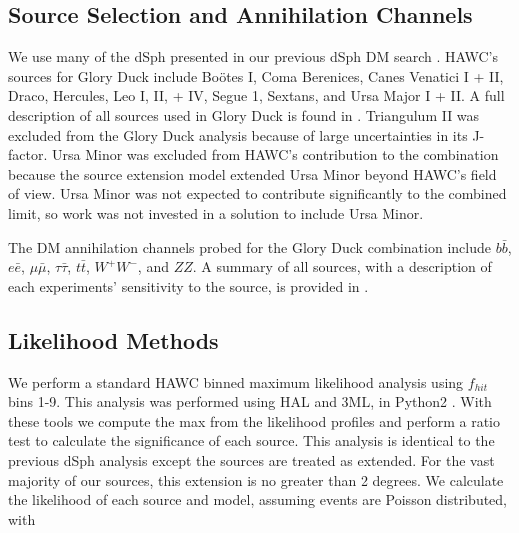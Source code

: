 \subsection{Source Selection and Annihilation Channels}\label{sec:gd_srcs_y_chan}

We use many of the dSph presented in our previous dSph DM search \cite{Albert_2018}.
HAWC's sources for Glory Duck include Boötes I, Coma Berenices, Canes Venatici I + II, Draco, Hercules, Leo I, II, + IV, Segue 1, Sextans, and Ursa Major I + II.
A full description of all sources used in Glory Duck is found in .
Triangulum II was excluded from the Glory Duck analysis because of large uncertainties in its J-factor.
Ursa Minor was excluded from HAWC's contribution to the combination because the source extension model extended Ursa Minor beyond HAWC's field of view.
Ursa Minor was not expected to contribute significantly to the combined limit, so work was not invested in a solution to include Ursa Minor.

The DM annihilation channels probed for the Glory Duck combination include $b\bar{b}$, $e\bar{e}$, $\mu\bar{\mu}$, $\tau\bar{\tau}$, $t\bar{t}$, $W^+W^-$, and $ZZ$.
A summary of all sources, with a description of each experiments' sensitivity to the source, is provided in .




\subsection{Likelihood Methods} \label{sec:gd_ll_methods}

We perform a standard HAWC binned maximum likelihood analysis using $f_{hit}$ bins 1-9.
This analysis was performed using HAL and 3ML, in Python2 \cite{Abeysekara_2017, vianello2015multimission}.
With these tools we compute the max from the likelihood profiles and perform a ratio test to calculate the significance of each source.
This analysis is identical to the previous dSph analysis \cite{Albert_2018} except the sources are treated as extended.
For the vast majority of our sources, this extension is no greater than 2 degrees.
We calculate the likelihood of each source and model, assuming events are Poisson distributed, with
\hwcpsLLH

